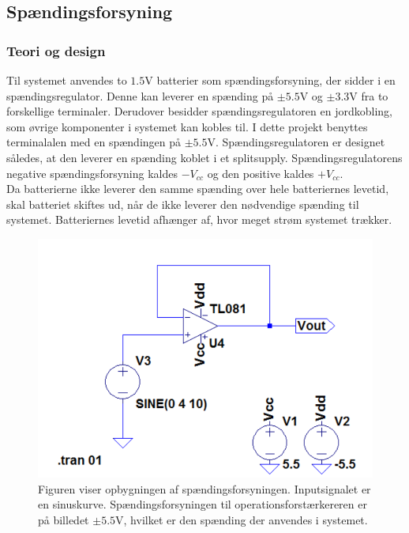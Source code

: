 \subsection{Spændingsforsyning}
\subsubsection{Teori og design}
Til systemet anvendes to $1.5$V batterier som spændingsforsyning, der sidder i en spændingsregulator. Denne kan leverer en spænding på $\pm5.5$V og $\pm3.3$V fra to forskellige terminaler. Derudover besidder spændingsregulatoren en jordkobling, som øvrige komponenter i systemet kan kobles til. I dette projekt benyttes terminalalen med en spændingen på $\pm5.5$V. Spændingsregulatoren er designet således, at den leverer en spænding koblet i et splitsupply. Spændingsregulatorens negative spændingsforsyning kaldes $-V_{cc}$ og den positive kaldes $+V_{cc}$. \\%
Da batterierne ikke leverer den samme spænding over hele batteriernes levetid, skal batteriet skiftes ud, når de ikke leverer den nødvendige spænding til systemet. Batteriernes levetid afhænger af, hvor meget strøm systemet trækker. %
\begin{figure}[H]
\centering
\includegraphics[scale=0.5]{figures/cProblemloesning/Spaendingsforsyning_LTspice.PNG}
\caption{Figuren viser opbygningen af spændingsforsyningen. Inputsignalet er en sinuskurve. Spændingsforsyningen til operationsforstærkereren er på billedet $\pm5.5$V, hvilket er den spænding der anvendes i systemet.}
\label{fig:spaendingsforsyning}
\end{figure}

